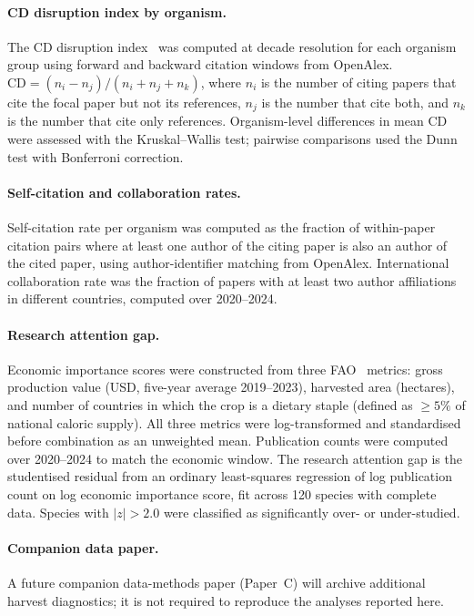 \paragraph{CD disruption index by organism.}
The CD disruption index~\cite{funk2017disruption} was computed at decade resolution
for each organism group using forward and backward citation windows from
OpenAlex.
$\mathrm{CD} = (n_i - n_j) / (n_i + n_j + n_k)$, where $n_i$ is the
number of citing papers that cite the focal paper but not its references,
$n_j$ is the number that cite both, and $n_k$ is the number that cite
only references.
Organism-level differences in mean CD were assessed with the
Kruskal--Wallis test; pairwise comparisons used the Dunn test with
Bonferroni correction.

\paragraph{Self-citation and collaboration rates.}
Self-citation rate per organism was computed as the fraction of within-paper
citation pairs where at least one author of the citing paper is also an
author of the cited paper, using author-identifier matching from OpenAlex.
International collaboration rate was the fraction of papers with at least
two author affiliations in different countries, computed over 2020--2024.

\paragraph{Research attention gap.}
Economic importance scores were constructed from three FAO~\cite{fao2023} metrics:
gross production value (USD, five-year average 2019--2023), harvested area
(hectares), and number of countries in which the crop is a dietary staple
(defined as $\geq 5\%$ of national caloric supply).
All three metrics were log-transformed and standardised before combination
as an unweighted mean.
Publication counts were computed over 2020--2024 to match the economic
window.
The research attention gap is the studentised residual from an ordinary
least-squares regression of log publication count on log economic importance
score, fit across 120 species with complete data.
Species with $|z| > 2.0$ were classified as significantly over- or
under-studied.

\paragraph{Companion data paper.}
A future companion data-methods paper (Paper~C) will archive additional harvest
diagnostics; it is not required to reproduce the analyses reported here.

